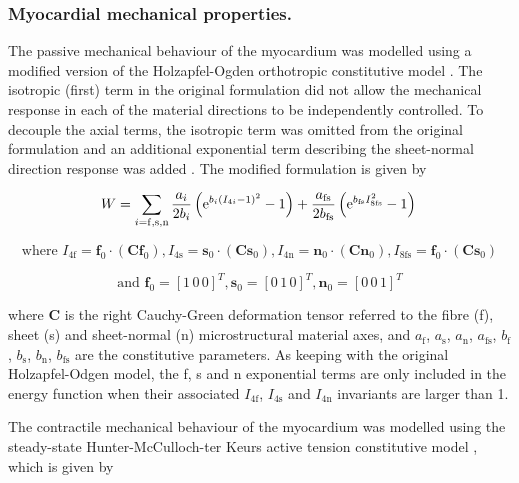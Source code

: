 \documentclass{llncs}
\begin{document}
\subsubsection{Myocardial mechanical properties.}

The passive mechanical behaviour of the myocardium was modelled using
a modified version of the Holzapfel-Ogden orthotropic constitutive
model \cite{Holz}.  The isotropic (first) term in the original formulation
 did not allow the mechanical response in each of the
material directions to be independently controlled. To decouple the axial terms, the isotropic term was omitted from the original formulation and an additional
exponential term describing the sheet-normal direction response was
added \cite{Justyna}. The modified formulation is given by
 
\begin{equation}
W=\sum\limits_{i=\mathrm{f,s,n}} \frac{a_{i}}{2b_{i}} \left(\mathrm{e}^{b_{i}(I_{\mathrm{4}i}-1)^2}-1\right)+ \frac{a_{\mathrm{fs}}}{2b_{\mathrm{fs}}} \left(\mathrm{e}^{b_{\mathrm{fs}}I^{2}_{8\mathrm{fs}}} -1\right)\newline
\end{equation}

\begin{equation}
\mbox{where }I_{4\mathrm{f}}= \mathbf{f} _{0}\cdot(\mathbf{Cf}_{0}), I_{4\mathrm{s}}=\mathbf{s}_{0}\cdot(\mathbf{Cs}_{0}), I_{4\mathrm{n}}=\mathbf{n}_{0}\cdot(\mathbf{Cn}_{0}), I_{8\mathrm{fs}}=\mathbf{f}_{0}\cdot(\mathbf{Cs}_{0})
\end{equation}

\begin{equation}
\mbox{and }\mathbf{f}_{0}=[1\,0\,0]^T, \mathbf{s}_{0}=[0\,1\,0]^T, \mathbf{n}_{0}=[0\,0\,1]^T
\end{equation}

where $\mathbf{C}$ is the right Cauchy-Green deformation tensor referred to the fibre (f), sheet (s) and sheet-normal (n) microstructural material axes, and $a_{\mathrm{f}}$, $a_{\mathrm{s}}$, $a_{\mathrm{n}}$, $a_{\mathrm{fs}}$, $b_{\mathrm{f}}$, $b_{\mathrm{s}}$, $b_{\mathrm{n}}$, $b_{\mathrm{fs}}$ are the constitutive parameters. As keeping with the original Holzapfel-Odgen model, the f, s and n exponential terms are only included in the energy function when their associated $I_{4\mathrm{f}}$, $I_{4\mathrm{s}}$ and $I_{4\mathrm{n}}$ invariants are larger than 1.

The contractile mechanical behaviour of the myocardium was modelled using the steady-state Hunter-McCulloch-ter Keurs active tension constitutive model \cite{Hunter}, which is given by
\end{document}
